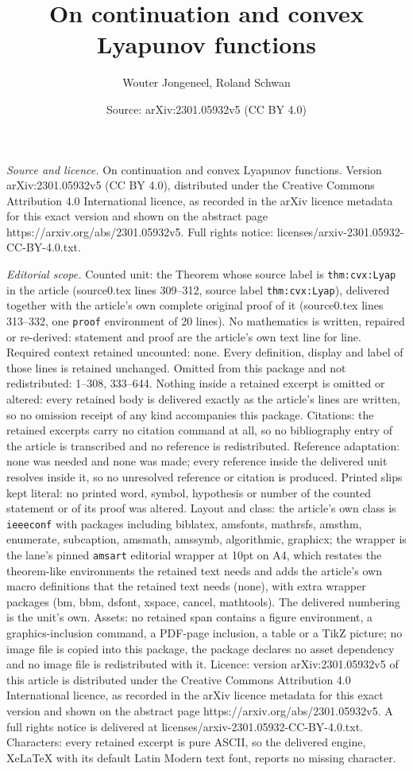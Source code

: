 \documentclass[10pt,a4paper]{amsart}
\title[On continuation and convex Lyapunov functions]{On continuation and convex Lyapunov functions}
\author{Wouter Jongeneel, Roland Schwan}
\date{Source: arXiv:2301.05932v5 (CC BY 4.0)}
\begin{document}
\maketitle

\noindent\emph{Source and licence.} On continuation and convex Lyapunov functions. Version arXiv:2301.05932v5 (CC BY 4.0), distributed under the Creative Commons Attribution 4.0 International licence, as recorded in the arXiv licence metadata for this exact version and shown on the abstract page https://arxiv.org/abs/2301.05932v5. Full rights notice: licenses/arxiv-2301.05932-CC-BY-4.0.txt.\par\smallskip

\noindent\textit{Editorial scope.} Counted unit: the Theorem whose source label is \texttt{thm:cvx:Lyap} in the article (source0.tex lines 309--312, source label \texttt{thm:cvx:Lyap}), delivered together with the article's own complete original proof of it (source0.tex lines 313--332, one \texttt{proof} environment of 20 lines). No mathematics is written, repaired or re-derived: statement and proof are the article's own text line for line. Required context retained uncounted: none. Every definition, display and label of those lines is retained unchanged. Omitted from this package and not redistributed: 1--308, 333--644. Nothing inside a retained excerpt is omitted or altered: every retained body is delivered exactly as the article's lines are written, so no omission receipt of any kind accompanies this package. Citations: the retained excerpts carry no citation command at all, so no bibliography entry of the article is transcribed and no reference is redistributed. Reference adaptation: none was needed and none was made; every reference inside the delivered unit resolves inside it, so no unresolved reference or citation is produced. Printed slips kept literal: no printed word, symbol, hypothesis or number of the counted statement or of its proof was altered. Layout and class: the article's own class is \texttt{ieeeconf} with packages including biblatex, amsfonts, mathrsfs, amsthm, enumerate, subcaption, amsmath, amssymb, algorithmic, graphicx; the wrapper is the lane's pinned \texttt{amsart} editorial wrapper at 10pt on A4, which restates the theorem-like environments the retained text needs and adds the article's own macro definitions that the retained text needs (none), with extra wrapper packages (bm, bbm, dsfont, xspace, cancel, mathtools). The delivered numbering is the unit's own. Assets: no retained span contains a figure environment, a graphics-inclusion command, a PDF-page inclusion, a table or a TikZ picture; no image file is copied into this package, the package declares no asset dependency and no image file is redistributed with it. Licence: version arXiv:2301.05932v5 of this article is distributed under the Creative Commons Attribution 4.0 International licence, as recorded in the arXiv licence metadata for this exact version and shown on the abstract page https://arxiv.org/abs/2301.05932v5. A full rights notice is delivered at licenses/arxiv-2301.05932-CC-BY-4.0.txt. Characters: every retained excerpt is pure ASCII, so the delivered engine, XeLaTeX with its default Latin Modern text font, reports no missing character.
\end{document}
